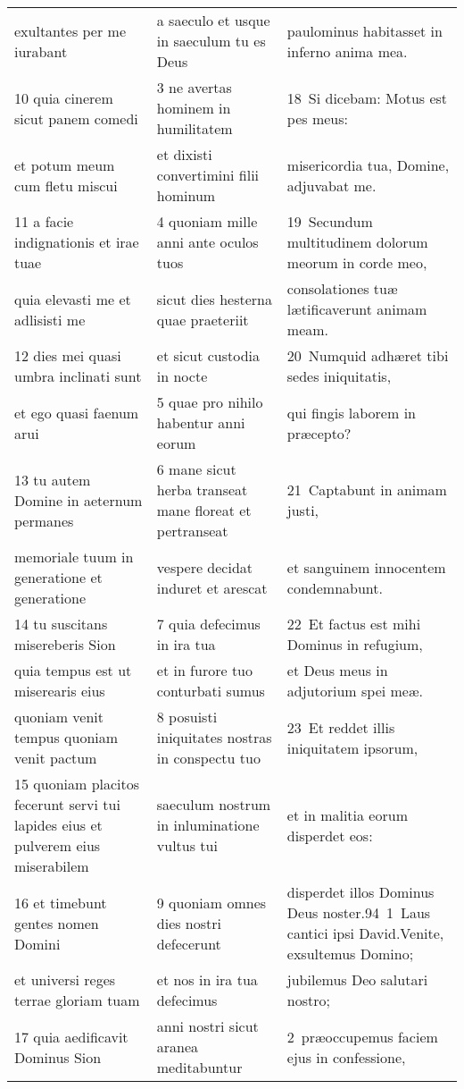 \documentclass{article}
\begin{document}
\begin{longtable}{@{}p{}p{}p{}@{}}
exultantes per me iurabant	&	a saeculo et usque in saeculum tu es Deus	&	paulominus habitasset in inferno anima mea.	\\
10 quia cinerem sicut panem comedi	&	3 ne avertas hominem in humilitatem	&	18 Si dicebam: Motus est pes meus:	\\
et potum meum cum fletu miscui	&	et dixisti convertimini filii hominum	&	misericordia tua, Domine, adjuvabat me.	\\
11 a facie indignationis et irae tuae	&	4 quoniam mille anni ante oculos tuos	&	19 Secundum multitudinem dolorum meorum in corde meo,	\\
quia elevasti me et adlisisti me	&	sicut dies hesterna quae praeteriit	&	consolationes tuæ lætificaverunt animam meam.	\\
12 dies mei quasi umbra inclinati sunt	&	et sicut custodia in nocte	&	20 Numquid adhæret tibi sedes iniquitatis,	\\
et ego quasi faenum arui	&	5 quae pro nihilo habentur anni eorum	&	qui fingis laborem in præcepto?	\\
13 tu autem Domine in aeternum permanes	&	6 mane sicut herba transeat mane floreat et pertranseat	&	21 Captabunt in animam justi,	\\
memoriale tuum in generatione et generatione	&	vespere decidat induret et arescat	&	et sanguinem innocentem condemnabunt.	\\
14 tu suscitans misereberis Sion	&	7 quia defecimus in ira tua	&	22 Et factus est mihi Dominus in refugium,	\\
quia tempus est ut miserearis eius	&	et in furore tuo conturbati sumus	&	et Deus meus in adjutorium spei meæ.	\\
quoniam venit tempus quoniam venit pactum	&	8 posuisti iniquitates nostras in conspectu tuo	&	23 Et reddet illis iniquitatem ipsorum,	\\
15 quoniam placitos fecerunt servi tui lapides eius et pulverem eius miserabilem	&	saeculum nostrum in inluminatione vultus tui	&	et in malitia eorum disperdet eos:	\\
16 et timebunt gentes nomen Domini	&	9 quoniam omnes dies nostri defecerunt	&	disperdet illos Dominus Deus noster.94 1 Laus cantici ipsi David.Venite, exsultemus Domino;	\\
et universi reges terrae gloriam tuam	&	et nos in ira tua defecimus	&	jubilemus Deo salutari nostro;	\\
17 quia aedificavit Dominus Sion	&	anni nostri sicut aranea meditabuntur	&	2 præoccupemus faciem ejus in confessione,	\\

\end{longtable}
\end{document}
